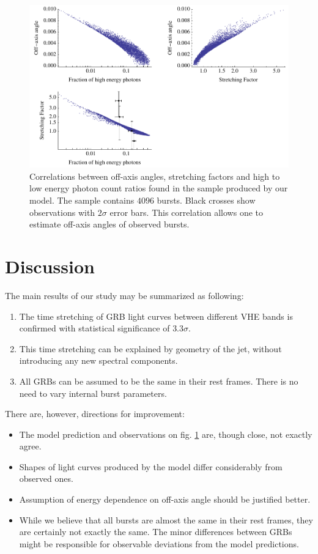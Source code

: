 \documentclass{article}
\begin{document}
\begin{figure}
        \centering
        \includegraphics[width=1.0\textwidth]{correlations}
        \caption{Correlations between off-axis angles, stretching factors and high to low energy photon count ratios found in the sample produced by our model. The sample contains $4096$ bursts. Black crosses show observations with $2\sigma$ error bars. This correlation allows one to estimate off-axis angles of observed bursts.}
        \label{fig:correlations}
\end{figure}

\section{Discussion}

\label{sec:discussion}

	The main results of our study may be summarized as following:
	\begin{enumerate}
		\item{
			The time stretching of GRB light curves between different VHE bands is confirmed with statistical significance of $3.3\sigma$.
		}
		\item{
			This time stretching can be explained by geometry of the jet, without introducing any new spectral components.
		}
		\item{
			All GRBs can be assumed to be the same in their rest frames.
			There is no need to vary internal burst parameters.
		}
	\end{enumerate}

	There are, however, directions for improvement:
	\begin{itemize}
		\item{
			The model prediction and observations on fig. \ref{fig:correlations} are, though close, not exactly agree.
		}
		\item{
			Shapes of light curves produced by the model differ considerably from observed ones.
		}
		\item{
			Assumption of energy dependence on off-axis angle should be justified better.
		}
		\item{
			While we believe that all bursts are almost the same in their rest frames, they are certainly not exactly the same.
			The minor differences between GRBs might be responsible for observable deviations from the model predictions.
		}
	\end{itemize}
\end{document}
